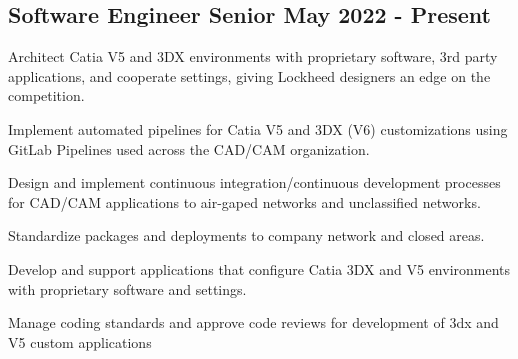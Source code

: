 \subsection{{Software Engineer Senior \hfill May 2022 - Present}}
\begin{zitemize}
	\item Architect Catia V5 and 3DX environments with proprietary software, 3rd party applications, and cooperate settings, giving Lockheed designers an edge on the competition. 
	\item Implement automated pipelines for Catia V5 and 3DX (V6) customizations using GitLab Pipelines used across the CAD/CAM organization.
	\item Design and implement continuous integration/continuous development  processes for CAD/CAM applications to air-gaped networks and unclassified networks.\\
	\item Standardize packages and deployments to company network and closed areas.
	\item Develop and support applications that configure Catia 3DX and V5 environments with proprietary software and settings.
	\item Manage coding standards and approve code reviews for development of 3dx and V5 custom applications\\
\end{zitemize}


